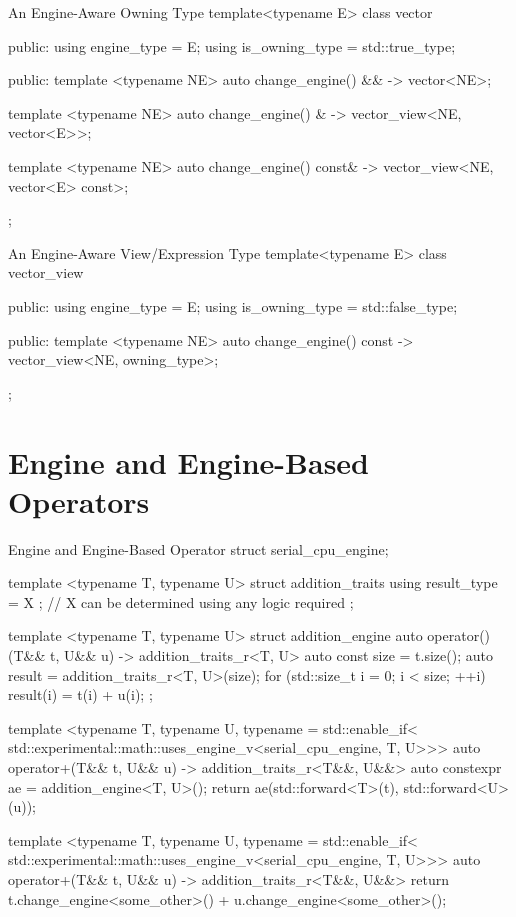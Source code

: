 \documentclass[oneside,11pt,a4paper]{jbarticle}
\begin{document}
\begin{codecpp}{An Engine-Aware Owning Type}
  template<typename E>
  class vector {
  public:
    using engine_type = E;
    using is_owning_type = std::true_type;

  public:
    template <typename NE>
    auto change_engine() && -> vector<NE>;

    template <typename NE>
    auto change_engine() & -> vector_view<NE, vector<E>>;

    template <typename NE>
    auto change_engine() const& -> vector_view<NE, vector<E> const>;
  };
\end{codecpp}

\begin{codecpp}{An Engine-Aware View/Expression Type}
  template<typename E>
  class vector_view {
  public:
    using engine_type = E;
    using is_owning_type = std::false_type;

  public:
    template <typename NE>
    auto change_engine() const -> vector_view<NE, owning_type>;
  };
\end{codecpp}

\section{Engine and Engine-Based Operators}

\begin{codecpp}{Engine and Engine-Based Operator}
struct serial_cpu_engine;

template <typename T, typename U>
struct addition_traits {
  using result_type = X ; // X can be determined using any logic required
};

template <typename T, typename U>
struct addition_engine {
  auto operator()(T&& t, U&& u) -> addition_traits_r<T, U>
  {
    auto const size = t.size();
    auto result = addition_traits_r<T, U>(size);
    for (std::size_t i = 0; i < size; ++i) {
      result(i) = t(i) + u(i);
    }
  }
};

template <typename T,
          typename U,
          typename = std::enable_if<
            std::experimental::math::uses_engine_v<serial_cpu_engine, T, U>>>
auto operator+(T&& t, U&& u) -> addition_traits_r<T&&, U&&>
{
  auto constexpr ae = addition_engine<T, U>();
  return ae(std::forward<T>(t), std::forward<U>(u));
}

template <typename T,
          typename U,
          typename = std::enable_if<
            std::experimental::math::uses_engine_v<serial_cpu_engine, T, U>>>
auto operator+(T&& t, U&& u) -> addition_traits_r<T&&, U&&>
{
  return t.change_engine<some_other>() + u.change_engine<some_other>();
}

\end{codecpp}
\end{document}
